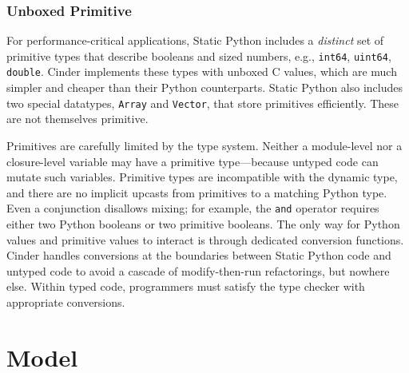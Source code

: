 \documentclass[english,cleveref,submission]{programming}
\newcommand{\SP}{Static Python}
\newcommand{\code}[1]{\texttt{#1}}
\begin{document}


\subsubsection{Unboxed Primitive}
\label{s:ctypes}

For performance-critical applications, \SP{} includes a \emph{distinct} set of primitive types
that describe booleans and sized numbers, e.g., \code{int64}, \code{uint64}, \code{double}.
Cinder implements these types with unboxed C values, which are much simpler and cheaper
than their Python counterparts.
\SP{} also includes two special datatypes, \code{Array} and \code{Vector}, that store primitives efficiently.
These are not themselves primitive.

Primitives are carefully limited by the type system.
Neither a module-level nor a closure-level variable may have a primitive
type---because untyped code can mutate such variables.
Primitive types are incompatible with the dynamic type,
and there are no implicit upcasts from primitives
to a matching Python type.
Even a conjunction disallows mixing; for example, the \code{and} operator
requires either two Python booleans or two primitive booleans.
The only way for Python values and primitive values to interact
is through dedicated conversion functions.
Cinder handles conversions at the boundaries between \SP{} code
and untyped code to avoid a cascade of modify-then-run refactorings, but nowhere else.
Within typed code, programmers must satisfy the type checker with
appropriate conversions.





\section{Model}
\label{s:model}

\end{document}

